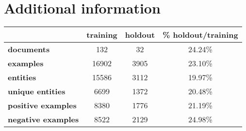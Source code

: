 \section{Additional information}

\begin{table}[ht]
    \centering
    {
        \begin{tabular}{lccc}
            \toprule
                                          & \textbf{training} & \textbf{holdout} & \textbf{\% holdout/training} \\
            \midrule
            \textbf{documents}         & 132               & 32               & 24.24\%                   \\
            \textbf{examples}          & 16902             & 3905             & 23.10\%                   \\
            \textbf{entities}          & 15586             & 3112             & 19.97\%                   \\
            \textbf{unique entities}   & 6699              & 1372             & 20.48\%                   \\
            \textbf{positive examples} & 8380              & 1776             & 21.19\%                   \\
            \textbf{negative examples} & 8522              & 2129             & 24.98\%                   \\
            \bottomrule
        \end{tabular}
    }
    \label{tab:training-holdout-set-distribution-annex}
\end{table}

